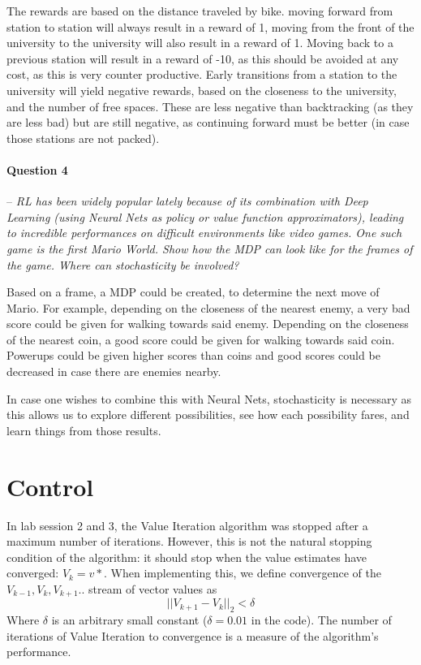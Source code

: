 \documentclass[a4paper]{article}
\newcommand{\question}[2]{
\paragraph{Question #1} -- \textit{#2}

}
\begin{document}
The rewards are based on the distance traveled by bike. moving forward from station to station will always result in a reward of 1, moving from the front of the university to the university will also result in a reward of 1. Moving back to a previous station will result in a reward of -10, as this should be avoided at any cost, as this is very counter productive. Early transitions from a station to the university will yield negative rewards, based on the closeness to the university, and the number of free spaces. These are less negative than backtracking (as they are less bad) but are still negative, as continuing forward must be better (in case those stations are not packed).

\question{4}{RL has been widely popular lately because of its combination with Deep Learning (using Neural Nets as policy or value function approximators), leading to incredible performances on difficult environments like video games. One such game is the first Mario World. Show how the MDP can look like for the frames of the game. Where can stochasticity be involved?}

Based on a frame, a MDP could be created, to determine the next move of Mario. For example, depending on the closeness of the nearest enemy, a very bad score could be given for walking towards said enemy. Depending on the closeness of the nearest coin, a good score could be given for walking towards said coin. Powerups could be given higher scores than coins and good scores could be decreased in case there are enemies nearby.

In case one wishes to combine this with Neural Nets, stochasticity is necessary as this allows us to explore different possibilities, see how each possibility fares, and learn things from those results.
\section{Control}
In lab session 2 and 3, the Value Iteration algorithm was stopped after a maximum number of iterations. However, this is not the natural stopping condition of the algorithm: it should stop when the value estimates have converged: $V_k = v*$. When implementing this, we define convergence of the $V_{k-1},V_k,V_{k+1}..$ stream of vector values as $$ \vert\vert V_{k+1} - V_k \vert\vert_2 < \delta $$
Where $\delta$ is an arbitrary small constant ($\delta = 0.01$ in the code). The number of iterations of Value Iteration to convergence is a measure of the algorithm's performance.\\
\end{document}
